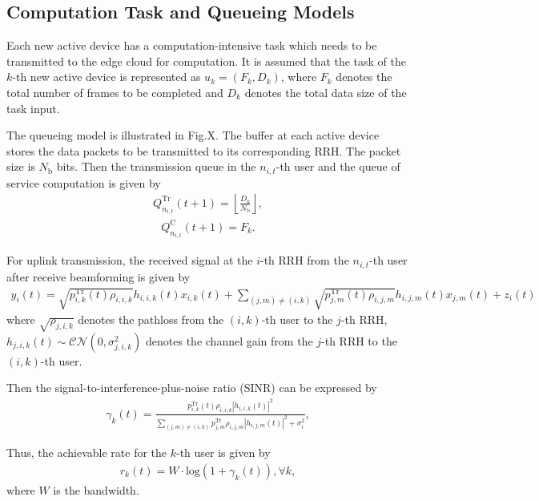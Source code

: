 \documentclass[12pt, draftclsnofoot, onecolumn]{IEEEtran}
\begin{document}
\subsection{Computation Task and Queueing Models}
Each new active device has a computation-intensive task which needs to be transmitted to the edge cloud for computation. It is assumed that the task of the $k$-th new active device is represented as $u_{k}=(F_{k},D_{k})$, where $F_{k}$ denotes the total number of frames to be completed and $D_{k}$ denotes the total data size of the task input.

The queueing model is illustrated in Fig.X. The buffer at each active device stores the data packets to be transmitted to its corresponding RRH. The packet size is ${N_\mathrm{b}}$ bits. Then the transmission queue in the $n_{i,t}$-th user and the queue of service computation is given by
\begin{align}
	Q_{n_{i,t}}^{\mathrm{Tr}}(t+1)=\left\lfloor\frac{D_{k}}{N_\mathrm{b}}\right\rfloor,
\end{align}
\begin{align}
	Q_{n_{i,t}}^{\mathrm{C}}(t+1)=F_{k}.
\end{align}

For uplink transmission, the received signal at the $i$-th RRH from the $n_{i,t}$-th user after receive beamforming is given by
\begin{align}
	y_{i}(t) = \sqrt{p_{i,k}^{\mathrm{Tr}}(t)\rho_{i,i,k}}h_{i,i,k}(t)x_{i,k}(t)+\sum_{(j,m)\neq (i,k)}\sqrt{p_{j,m}^{\mathrm{Tr}}(t)\rho_{i,j,m}}h_{i,j,m}(t)x_{j,m}(t)+z_{i}(t)
\end{align}
where $\sqrt{\rho_{j,i,k}}$ denotes the pathloss from the $(i,k)$-th user to the $j$-th RRH, $h_{j,i,k}(t)\sim \mathcal{CN}(0,\sigma_{j,i,k}^{2})$ denotes the channel gain from the $j$-th RRH to the $(i,k)$-th user.

Then the signal-to-interference-plus-noise ratio (SINR) can be expressed by
\begin{align}
	\gamma_{k}(t)=\frac{p_{i,k}^{\mathrm{Tr}}(t)\rho_{i,i,k}|h_{i,i,k}(t)|^2}{\sum_{(j,m)\neq (i,k)}p_{j,m}^{\mathrm{Tr}}\rho_{i,j,m}|h_{i,j,m}(t)|^{2}+\sigma_{i}^{2}},
\end{align}

Thus, the achievable rate for the $k$-th user is given by
\begin{align}
	r_{k}(t)= W\cdot \text{log}(1+\gamma_{k}(t)), \forall k,
\end{align}
where $W$ is the bandwidth.
\end{document}
